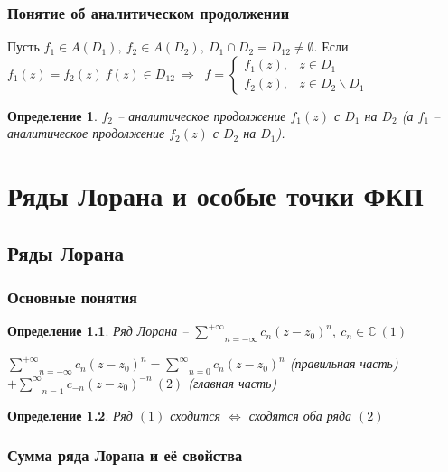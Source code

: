 \documentclass[final]{report}
\newcommand{\then}{\ \Rightarrow\ }
\renewcommand{\C}{\mathbb{C}}
\newcommand{\msum}[2]{\underset{#1}{\overset{#2}{\sum}}}
\newcommand{\rsum}{\msum{n=1}{\infty}}
\newcommand{\ssum}{\msum{n=0}{\infty}}
\newcommand{\lsum}{\msum{n=-\infty}{+\infty}}
\newcommand{\LRA}{\Leftrightarrow}
\newcommand{\sys}[1]{\left\{\begin{matrix}#1\end{matrix}\right.}
\newcommand{\opr}[1]{\begin{opred}#1\end{opred}}
\newtheorem*{opred}{Определение}
\theoremstyle{remark}
\begin{document}
\subsection{Понятие об аналитическом продолжении}

Пусть $f_1\in A(D_1),\ f_2\in A(D_2),\ D_1\cap D_2=D_{12}\neq\emptyset$. Если $f_1(z)=f_2(z)\ f(z)\in D_{12}\then$
$f=\sys{f_1(z),&z\in D_1 \\ f_2(z),&z\in D_2\smallsetminus D_1}$

\opr{$f_2$ -- аналитическое продолжение $f_1(z)$ с $D_1$ на $D_2$ (а $f_1$ -- аналитическое продолжение $f_2(z)$ с $D_2$ на $D_1$).}

\chapter{Ряды Лорана и особые точки ФКП}


\section{Ряды Лорана}

\subsection{Основные понятия}

\opr{Ряд Лорана -- $\lsum c_n(z-z_0)^n,\ c_n\in\C\ (1)$

$\lsum c_n(z-z_0)^n=\ssum c_n(z-z_0)^n$ (правильная часть) $+\rsum c_{-n}(z-z_0)^{-n}\ (2)$ (главная часть)}

\opr{Ряд $(1)$ сходится $\LRA$ сходятся оба ряда $(2)$}

\subsection{Сумма ряда Лорана и её свойства}
\end{document}
